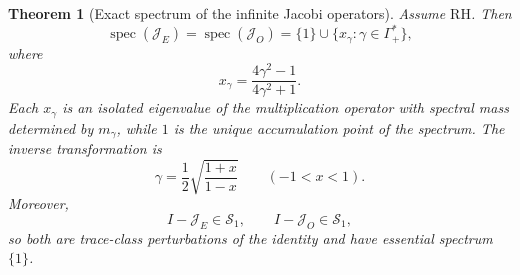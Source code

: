 \documentclass[11pt]{amsart}
\numberwithin{equation}{section}
\theoremstyle{plain}
\newtheorem{theorem}{Theorem}[section]
\theoremstyle{definition}
\theoremstyle{remark}
\newcommand{\RH}{\mathrm{RH}}
\newcommand{\spec}{\operatorname{spec}}
\begin{document}
\begin{theorem}[Exact spectrum of the infinite Jacobi operators]
\label{thm:jacobi_zero_support}
Assume $\RH$. Then
\begin{equation}
\spec(\mathcal J_E)=\spec(\mathcal J_O)
=\{1\}\cup\{x_\gamma:\gamma\in\Gamma_+^*\},
\label{eq:jacobi_support}
\end{equation}
where
\begin{equation}
x_\gamma=\frac{4\gamma^2-1}{4\gamma^2+1}.
\label{eq:jacobi_xgamma_repeat}
\end{equation}
Each $x_\gamma$ is an isolated eigenvalue of the multiplication operator with spectral mass determined by $m_\gamma$, while $1$ is the unique accumulation point of the spectrum. The inverse transformation is
\begin{equation}
\gamma=\frac12\sqrt{\frac{1+x}{1-x}}
\qquad(-1<x<1).
\label{eq:gamma_from_x}
\end{equation}
Moreover,
\begin{equation}
I-\mathcal J_E\in\mathcal S_1,
\qquad
I-\mathcal J_O\in\mathcal S_1,
\label{eq:Jacobi_trace_class}
\end{equation}
so both are trace-class perturbations of the identity and have essential spectrum $\{1\}$.
\end{theorem}
\end{document}
